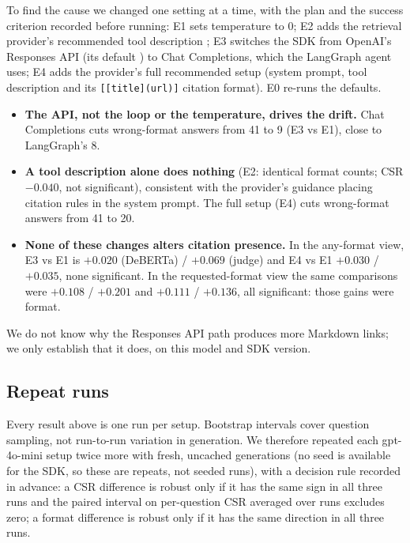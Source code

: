 \documentclass[11pt]{article}
\newcommand{\code}[1]{\texttt{#1}}
\begin{document}
To find the cause we changed one setting at a time, with the plan and the success criterion
recorded before running: E1 sets temperature to 0; E2 adds the retrieval provider's recommended
tool description \citep{kapa2025promptagent}; E3 switches the SDK from OpenAI's Responses API (its
default \citep{openai2025responses}) to Chat Completions, which the LangGraph agent uses; E4 adds the
provider's full recommended setup (system prompt, tool description and its \code{[[title](url)]}
citation format). E0 re-runs the defaults.

\begin{itemize}
\item \textbf{The API, not the loop or the temperature, drives the drift.} Chat Completions cuts
wrong-format answers from 41 to 9 (E3 vs E1), close to LangGraph's 8.
\item \textbf{A tool description alone does nothing} (E2: identical format counts; CSR
$-0.040$, not significant), consistent with the provider's guidance placing citation rules in the
system prompt. The full setup (E4) cuts wrong-format answers from 41 to 20.
\item \textbf{None of these changes alters citation presence.} In the any-format view, E3 vs E1 is
$+0.020$ (DeBERTa) / $+0.069$ (judge) and E4 vs E1 $+0.030$ / $+0.035$, none significant. In the
requested-format view the same comparisons were $+0.108$ / $+0.201$ and $+0.111$ / $+0.136$, all
significant: those gains were format.
\end{itemize}

We do not know why the Responses API path produces more Markdown links; we only establish that it
does, on this model and SDK version.

\subsection{Repeat runs}
\label{sec:repeats}

Every result above is one run per setup. Bootstrap intervals cover question sampling, not
run-to-run variation in generation. We therefore repeated each gpt-4o-mini setup twice more with
fresh, uncached generations (no seed is available for the SDK, so these are repeats, not seeded
runs), with a decision rule recorded in advance: a CSR difference is robust only if it has the
same sign in all three runs and the paired interval on per-question CSR averaged over runs excludes
zero; a format difference is robust only if it has the same direction in all three runs.
\end{document}
